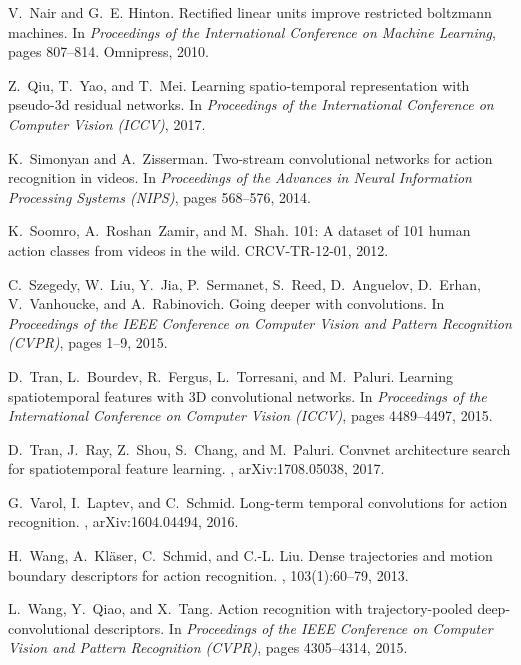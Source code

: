 \documentclass[10pt,twocolumn,letterpaper]{article}
\begin{document}
{\begin{thebibliography}{10}
  V.~Nair and G.~E. Hinton.
  \newblock Rectified linear units improve restricted boltzmann machines.
  \newblock In {\em Proceedings of the International Conference on Machine
    Learning}, pages 807--814. Omnipress, 2010.
  
  Z.~Qiu, T.~Yao, and T.~Mei.
  \newblock Learning spatio-temporal representation with pseudo-3d residual
    networks.
  \newblock In {\em Proceedings of the International Conference on Computer
    Vision (ICCV)}, 2017.
  
  K.~Simonyan and A.~Zisserman.
  \newblock Two-stream convolutional networks for action recognition in videos.
  \newblock In {\em Proceedings of the Advances in Neural Information Processing
    Systems (NIPS)}, pages 568--576, 2014.
  
  K.~Soomro, A.~Roshan~Zamir, and M.~Shah.
  101: A dataset of 101 human action classes from videos in the
    wild.
  \newblock CRCV-TR-12-01, 2012.
  
  C.~Szegedy, W.~Liu, Y.~Jia, P.~Sermanet, S.~Reed, D.~Anguelov, D.~Erhan,
    V.~Vanhoucke, and A.~Rabinovich.
  \newblock Going deeper with convolutions.
  \newblock In {\em Proceedings of the {IEEE} Conference on Computer Vision and
    Pattern Recognition (CVPR)}, pages 1--9, 2015.
  
  D.~Tran, L.~Bourdev, R.~Fergus, L.~Torresani, and M.~Paluri.
  \newblock Learning spatiotemporal features with 3{D} convolutional networks.
  \newblock In {\em Proceedings of the International Conference on Computer
    Vision (ICCV)}, pages 4489--4497, 2015.
  
  D.~Tran, J.~Ray, Z.~Shou, S.~Chang, and M.~Paluri.
  \newblock Convnet architecture search for spatiotemporal feature learning.
  , arXiv:1708.05038, 2017.
  
  G.~Varol, I.~Laptev, and C.~Schmid.
  \newblock Long-term temporal convolutions for action recognition.
  , arXiv:1604.04494, 2016.
  
  H.~Wang, A.~Kl{\"a}ser, C.~Schmid, and C.-L. Liu.
  \newblock Dense trajectories and motion boundary descriptors for action
    recognition.
  , 103(1):60--79, 2013.
  
  L.~Wang, Y.~Qiao, and X.~Tang.
  \newblock Action recognition with trajectory-pooled deep-convolutional
    descriptors.
  \newblock In {\em Proceedings of the IEEE Conference on Computer Vision and
    Pattern Recognition (CVPR)}, pages 4305--4314, 2015.
  

\end{thebibliography}}
\end{document}
